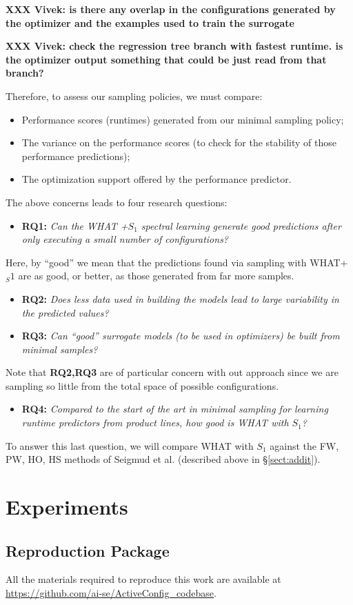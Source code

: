 \documentclass{sig-alternative}
\newcommand{\bi}{\begin{itemize}}%
\newcommand{\ei}{\end{itemize}}
\newcommand{\tion}[1]{\S\ref{sect:#1}}
\begin{document}
{\bf XXX Vivek: is there any overlap in the
configurations generated by the optimizer and the
examples used to train the surrogate}

{\bf XXX Vivek: check the regression tree branch with
fastest runtime. is the optimizer output
something that could be just read from that branch?}


Therefore, to assess our sampling policies, we must compare:
\bi
\item Performance scores (runtimes) generated from our minimal sampling policy;
\item The variance on the performance scores (to check for the stability
of those performance predictions);
\item The optimization support offered by the performance predictor.
\ei
The above concerns leads to four research questions:
\bi
\item {\bf RQ1:} {\em Can the WHAT  +$S_1$ spectral learning generate good predictions after only
executing a small number of configurations?}
\ei
Here, by ``good'' we mean that the predictions found via sampling with WHAT+$_S1$ are as good, or better,
as those generated from far more samples.
\bi
\item {\bf RQ2:} {\em
Does less data used in building the models lead to large variability in the predicted values?}
\item {\bf RQ3:} {\em
Can ``good'' surrogate models (to be used in optimizers)
be built from minimal samples?}
\ei
Note that {\bf RQ2,RQ3} are of particular concern with out approach
since we are sampling so little from the total space of possible
configurations.
\bi
\item {\bf RQ4:} {\em Compared to the start of the art in minimal sampling for
learning runtime predictors from product lines, how good is WHAT with $S_1$?}
\ei
To answer this last question, we will compare WHAT with $S_1$
           against the FW, PW, HO, HS methods of Seigmud et al. (described above in \tion{addit}).
 
\section{Experiments}

\subsection{Reproduction Package}

All the materials required to reproduce this work are available at \textcolor{red}{\url{https://github.com/ai-se/ActiveConfig_codebase}}.
\end{document}
